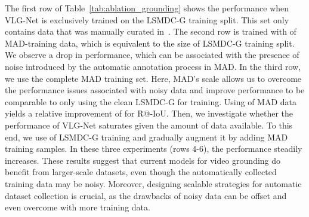 \documentclass[10pt,twocolumn,letterpaper]{article}
\begin{document}
The first row of Table~\ref{tab:ablation_grounding} shows the performance when VLG-Net is exclusively trained on the LSMDC-G training split. This set only contains data that was manually curated in~\cite{rohrbach2017movie}. The second row is trained with  of MAD-training data, which is equivalent to the size of LSMDC-G training split. We observe a drop in performance, which can be associated with the presence of noise introduced by the automatic annotation process in MAD. In the third row, we use the complete MAD training set. Here, MAD's scale allows us to overcome the performance issues associated with noisy data and improve performance to be comparable to only using the clean LSMDC-G for training. Using  of MAD data yields a relative improvement of  for R@-IoU. Then, we investigate whether the performance of VLG-Net saturates given the amount of data available. To this end, we use  of LSMDC-G training and gradually augment it by adding MAD training samples. In these three experiments (rows 4-6), the performance steadily increases. These results suggest that current models for video grounding do benefit from larger-scale datasets, even though the automatically collected training data may be noisy. Moreover, designing scalable strategies for automatic dataset collection is crucial, as the drawbacks of noisy data can be offset and even overcome with more training data.

\begin{table}[!t]
    \centering
\setlength{\tabcolsep}{3pt}
\renewcommand{\arraystretch}{1} 
\vspace{-.1cm}
\caption{\label{tab:ablation_retrieval}{\bf Retrieval performance on LSMDC16 with model CLIP4Clip~\cite{luo2021clip4clip}.}  
This experiment showcases how MAD data can be valuable for a related task, beyond grounding.  
}
\vspace{-.2cm}
 \end{table}
\end{document}

